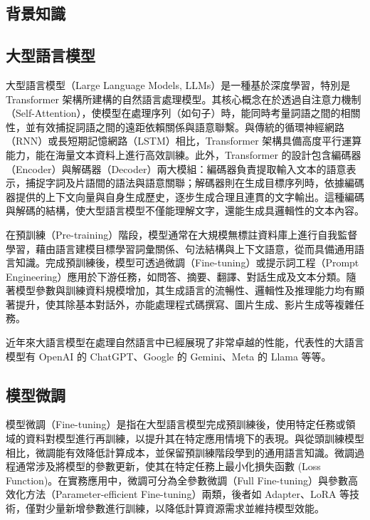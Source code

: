 \begin{ZhChapter}

\chapter{背景知識}

\section{大型語言模型}

大型語言模型（Large Language Models, LLMs）是一種基於深度學習，特別是 Transformer 架構所建構的自然語言處理模型。其核心概念在於透過自注意力機制（Self-Attention），使模型在處理序列（如句子）時，能同時考量詞語之間的相關性，並有效捕捉詞語之間的遠距依賴關係與語意聯繫。與傳統的循環神經網路（RNN）或長短期記憶網路（LSTM）相比，Transformer 架構具備高度平行運算能力，能在海量文本資料上進行高效訓練。此外，Transformer 的設計包含編碼器（Encoder）與解碼器（Decoder）兩大模組：編碼器負責提取輸入文本的語意表示，捕捉字詞及片語間的語法與語意關聯；解碼器則在生成目標序列時，依據編碼器提供的上下文向量與自身生成歷史，逐步生成合理且連貫的文字輸出。這種編碼與解碼的結構，使大型語言模型不僅能理解文字，還能生成具邏輯性的文本內容。

在預訓練（Pre-training）階段，模型通常在大規模無標註資料庫上進行自我監督學習，藉由語言建模目標學習詞彙關係、句法結構與上下文語意，從而具備通用語言知識。完成預訓練後，模型可透過微調（Fine-tuning）或提示詞工程（Prompt Engineering）應用於下游任務，如問答、摘要、翻譯、對話生成及文本分類。隨著模型參數與訓練資料規模增加，其生成語言的流暢性、邏輯性及推理能力均有顯著提升，使其除基本對話外，亦能處理程式碼撰寫、圖片生成、影片生成等複雜任務。

近年來大語言模型在處理自然語言中已經展現了非常卓越的性能，代表性的大語言模型有 OpenAI 的 ChatGPT、Google 的 Gemini、Meta 的 Llama 等等。

\section{模型微調}

模型微調（Fine-tuning）是指在大型語言模型完成預訓練後，使用特定任務或領域的資料對模型進行再訓練，以提升其在特定應用情境下的表現。與從頭訓練模型相比，微調能有效降低計算成本，並保留預訓練階段學到的通用語言知識。微調過程通常涉及將模型的參數更新，使其在特定任務上最小化損失函數 (Loss Function)。在實務應用中，微調可分為全參數微調（Full Fine-tuning）與參數高效化方法（Parameter-efficient Fine-tuning）兩類，後者如 Adapter、LoRA 等技術，僅對少量新增參數進行訓練，以降低計算資源需求並維持模型效能。


\end{ZhChapter}
